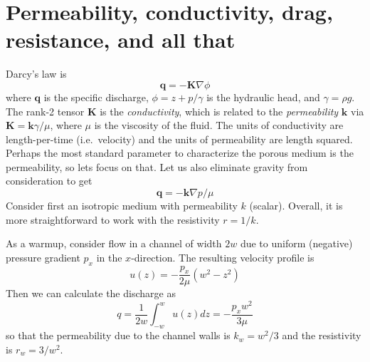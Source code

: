 \documentclass[11pt]{article}
\newcommand{\grad}{\nabla}
\newcommand{\bvec}[1]{\ensuremath{\boldsymbol{#1}}}
\newcommand {\bq} {\bvec{q}}
\begin{document}
\section{Permeability, conductivity, drag, resistance, and all that}

Darcy's law is
\begin{equation}
\bq = - \bvec{K} \grad \phi
\end{equation}
where $\bq$ is the specific discharge, $\phi = z + p/\gamma$ is the hydraulic head, and $\gamma = \rho g$. The rank-2 tensor $\bvec{K}$ is the {\em conductivity}, which is related to the {\em permeability} $\bvec{k}$ via $\bvec{K} = \bvec{k} \gamma/\mu$, where $\mu$ is the viscosity of the fluid. The units of conductivity are length-per-time (i.e.~velocity) and the units of permeability are length squared.
Perhaps the most standard parameter to characterize the porous medium is the permeability, so lets focus on that. Let us also eliminate gravity from consideration to get
\begin{equation}
\bq = - \bvec{k} \grad p / \mu
\end{equation}
Consider first an isotropic medium with permeability $k$ (scalar). Overall, it is more straightforward to work with the resistivity $r = 1/k$.

As a warmup, consider flow in a channel of width $2w$ due to uniform (negative) pressure gradient $p_x$ in the $x$-direction. The resulting velocity profile is
\begin{equation}
u(z) = -\frac{p_x}{2 \mu} (w^2 - z^2)
\end{equation}
Then we can calculate the discharge as
\begin{equation}
q = \frac{1}{2w} \int_{-w}^{w} u(z) dz = - \frac{ p_x w^2}{3 \mu} 
\end{equation}
so that the permeability due to the channel walls is $k_w = w^2/3$ and the resistivity is $r_w = 3/w^2$.
\end{document}
